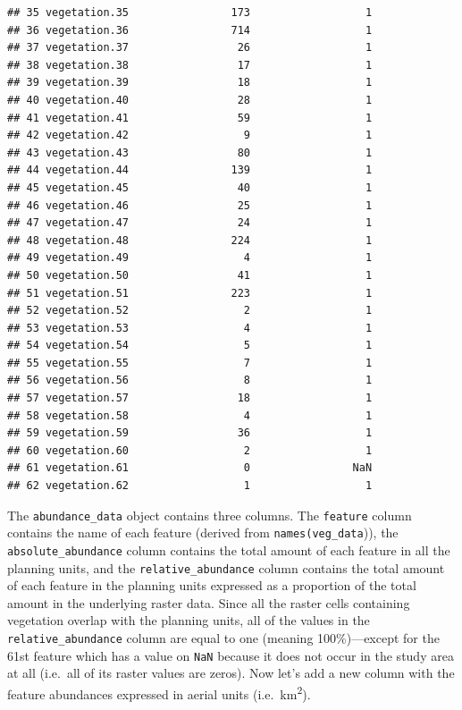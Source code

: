 \documentclass[12pt,]{book}
\begin{document}
\begin{verbatim}
## 35 vegetation.35                173                  1
## 36 vegetation.36                714                  1
## 37 vegetation.37                 26                  1
## 38 vegetation.38                 17                  1
## 39 vegetation.39                 18                  1
## 40 vegetation.40                 28                  1
## 41 vegetation.41                 59                  1
## 42 vegetation.42                  9                  1
## 43 vegetation.43                 80                  1
## 44 vegetation.44                139                  1
## 45 vegetation.45                 40                  1
## 46 vegetation.46                 25                  1
## 47 vegetation.47                 24                  1
## 48 vegetation.48                224                  1
## 49 vegetation.49                  4                  1
## 50 vegetation.50                 41                  1
## 51 vegetation.51                223                  1
## 52 vegetation.52                  2                  1
## 53 vegetation.53                  4                  1
## 54 vegetation.54                  5                  1
## 55 vegetation.55                  7                  1
## 56 vegetation.56                  8                  1
## 57 vegetation.57                 18                  1
## 58 vegetation.58                  4                  1
## 59 vegetation.59                 36                  1
## 60 vegetation.60                  2                  1
## 61 vegetation.61                  0                NaN
## 62 vegetation.62                  1                  1
\end{verbatim}

The \texttt{abundance\_data} object contains three columns. The
\texttt{feature} column contains the name of each feature (derived from
\texttt{names(veg\_data})), the \texttt{absolute\_abundance} column
contains the total amount of each feature in all the planning units, and
the \texttt{relative\_abundance} column contains the total amount of
each feature in the planning units expressed as a proportion of the
total amount in the underlying raster data. Since all the raster cells
containing vegetation overlap with the planning units, all of the values
in the \texttt{relative\_abundance} column are equal to one (meaning
100\%)---except for the 61st feature which has a value on \texttt{NaN}
because it does not occur in the study area at all (i.e.~all of its
raster values are zeros). Now let's add a new column with the feature
abundances expressed in aerial units (i.e.~km\textsuperscript{2}).
\end{document}
